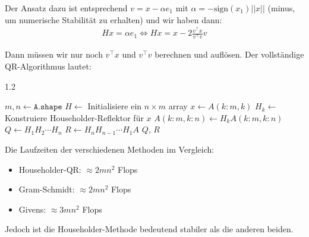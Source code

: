 Der Ansatz dazu ist entsprechend $v = x - \alpha e_1$ mit $\alpha = -\text{sign}(x_1)||x||$ (minus, um numerische Stabilität zu erhalten) und wir haben dann:
\drmvspace
\begin{align*}
    Hx = \alpha e_1 \Longleftrightarrow Hx = x - 2 \frac{v^\top x}{v^\top v} v
\end{align*}

\drmvspace
Dann müssen wir nur noch $v^\top x$ und $v^\top v$ berechnen und auflösen.
Der vollständige QR-Algorithmus lautet:
\begin{algorithm}
    \begin{spacing}{1.2}
        \caption{\textsc{HouseholderQR}(A)}
        \begin{algorithmic}[1]
            \State $m, n \gets \texttt{A.shape}$
            \State $H \gets$ Initialisiere ein $n \times m$ array
                \State $x \gets A(k : m, k)$ 
                \State $H_k \gets$ Konstruiere Householder-Reflektor für $x$
                \State $A(k : m, k : n) \gets H_k A(k : m, k : n)$ 
            \EndFor
            \State $Q \gets H_1 H_2 \cdots H_n$
            \State $R \gets H_n H_{n - 1} \cdots H_1 A$
            \State \Return $Q$, $R$
        \end{algorithmic}
    \end{spacing}
\end{algorithm}

\drmvspace
Die Laufzeiten der verschiedenen Methoden im Vergleich:
\begin{itemize}[noitemsep]
    \item Householder-QR: $\approx 2mn^2$ Flops
    \item Gram-Schmidt: $\approx 2mn^2$ Flops
    \item Givens: $\approx 3mn^2$ Flops
\end{itemize}
Jedoch ist die Householder-Methode bedeutend stabiler als die anderen beiden.
